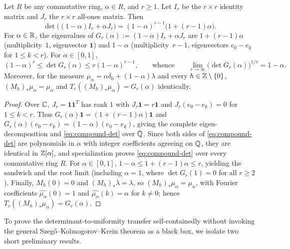 \documentclass[11pt]{article}
\begin{document}
\begin{proposition}\label{prop:compound-det}
Let $R$ be any commutative ring, $\alpha\in R$, and $r\ge1$. Let $I_r$ be the $r\times r$ identity matrix and $J_r$ the $r\times r$ all-ones matrix. Then
\begin{equation}\label{eq:compound-det}
\det\bigl((1-\alpha)I_r+\alpha J_r\bigr)=(1-\alpha)^{r-1}\bigl(1+(r-1)\alpha\bigr).
\end{equation}
For $\alpha\in\mathbb R$, the eigenvalues of $G_r(\alpha):=(1-\alpha)I_r+\alpha J_r$ are $1+(r-1)\alpha$ (multiplicity~$1$, eigenvector $\mathbf 1$) and $1-\alpha$ (multiplicity~$r-1$, eigenvectors $e_0-e_k$ for $1\le k<r$). For $\alpha\in[0,1]$,
\[
(1-\alpha)^r\le\det G_r(\alpha)\le r(1-\alpha)^{r-1},
\qquad\text{whence}\qquad
\lim_{r\to\infty}\bigl(\det G_r(\alpha)\bigr)^{1/r}=1-\alpha.
\]
Moreover, for the measure $\mu_\alpha=\alpha\delta_0+(1-\alpha)\lambda$ and every $h\in\mathbb Z\setminus\{0\}$, $(M_h)_*\mu_\alpha=\mu_\alpha$ and $T_r((M_h)_*\mu_\alpha)=G_r(\alpha)$ identically.
\end{proposition}

\begin{proof}
Over $\mathbb C$, $J_r=\mathbf 1\mathbf 1^T$ has rank $1$ with $J_r\mathbf 1=r\mathbf 1$ and $J_r(e_0-e_k)=0$ for $1\le k<r$. Thus $G_r(\alpha)\mathbf 1=(1+(r-1)\alpha)\mathbf 1$ and $G_r(\alpha)(e_0-e_k)=(1-\alpha)(e_0-e_k)$, giving the complete eigen-decomposition and \eqref{eq:compound-det} over $\mathbb Q$. Since both sides of \eqref{eq:compound-det} are polynomials in $\alpha$ with integer coefficients agreeing on $\mathbb Q$, they are identical in $\mathbb Z[\alpha]$, and specialization proves \eqref{eq:compound-det} over every commutative ring $R$. For $\alpha\in[0,1]$, $1-\alpha\le 1+(r-1)\alpha\le r$, yielding the sandwich and the root limit (including $\alpha=1$, where $\det G_r(1)=0$ for all $r\ge2$). Finally, $M_h(0)=0$ and $(M_h)_*\lambda=\lambda$, so $(M_h)_*\mu_\alpha=\mu_\alpha$, with Fourier coefficients $\widehat{\mu_\alpha}(0)=1$ and $\widehat{\mu_\alpha}(k)=\alpha$ for $k\ne0$; hence $T_r((M_h)_*\mu_\alpha)=G_r(\alpha)$.
\end{proof}

To prove the determinant-to-uniformity transfer self-containedly without invoking the general Szeg\H{o}--Kolmogorov--Krein theorem as a black box, we isolate two short preliminary results.
\end{document}
